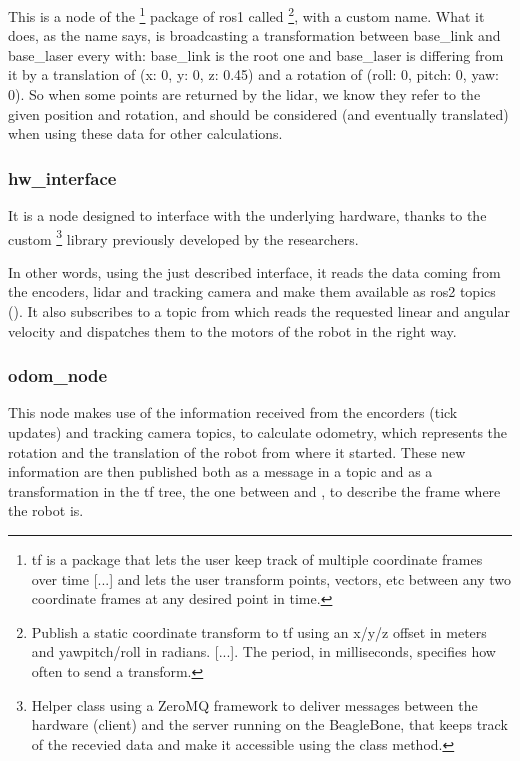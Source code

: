 This is a node of the \footnote{tf is a package that lets the user keep track of multiple coordinate frames over time [...] and lets the user transform points, vectors, etc between any two coordinate frames at any desired point in time.\cite{tf}} package of \Acrshort{ros}1 called \footnote{Publish a static coordinate transform to tf using an x/y/z offset in meters and yaw\/pitch/roll in radians. [...]. The period, in milliseconds, specifies how often to send a transform.}, with a custom name. What it does, as the name says, is broadcasting a transformation between base\_link and base\_laser every  with: base\_link is the root one and base\_laser is differing from it by a translation of (x: 0, y: 0, z: 0.45) and a rotation of (roll: 0, pitch: 0, yaw: 0). So when some points are returned by the lidar, we know they refer to the given position and rotation, and should be considered (and eventually translated) when using these data for other calculations.

\subsubsection{hw\_interface}

It is a node designed to interface with the underlying hardware, thanks to the custom \footnote{Helper class using a ZeroMQ framework to deliver messages between the hardware (client) and the server running on the BeagleBone, that keeps track of the recevied data and make it accessible using the class method.} library previously developed by the researchers.

In other words, using the just described interface, it reads the data coming from the encoders, lidar and tracking camera and make them available as \Acrshort{ros}2 topics (). It also subscribes to a  topic from which reads the requested linear and angular velocity and dispatches them to the motors of the robot in the right way.

\subsubsection{odom\_node}

This node makes use of the information received from the encorders (tick updates) and tracking camera topics, to calculate odometry, which represents the rotation and the translation of the robot from where it started. These new information are then published both as a message in a topic and as a transformation in the tf tree, the one between  and , to describe the frame where the robot is.